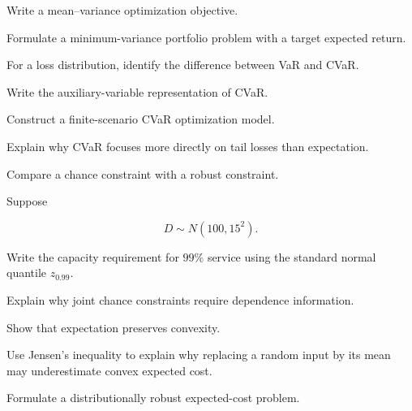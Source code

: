 \begin{exercise}[3]
Write a mean--variance optimization objective.
\end{exercise}

\begin{exercise}[3]
Formulate a minimum-variance portfolio problem with a target expected
return.
\end{exercise}

\begin{exercise}[3]
For a loss distribution, identify the difference between VaR and CVaR.
\end{exercise}

\begin{exercise}[3]
Write the auxiliary-variable representation of CVaR.
\end{exercise}

\begin{exercise}[3]
Construct a finite-scenario CVaR optimization model.
\end{exercise}

\begin{exercise}[3]
Explain why CVaR focuses more directly on tail losses than expectation.
\end{exercise}

\begin{exercise}[3]
Compare a chance constraint with a robust constraint.
\end{exercise}

\begin{exercise}[3]
Suppose

\[
D\sim N(100,15^2).
\]

Write the capacity requirement for \(99\%\) service using the standard
normal quantile \(z_{0.99}\).
\end{exercise}

\begin{exercise}[3]
Explain why joint chance constraints require dependence information.
\end{exercise}

\begin{exercise}[3]
Show that expectation preserves convexity.
\end{exercise}

\begin{exercise}[3]
Use Jensen's inequality to explain why replacing a random input by its mean
may underestimate convex expected cost.
\end{exercise}

\begin{exercise}[3]
Formulate a distributionally robust expected-cost problem.
\end{exercise}

